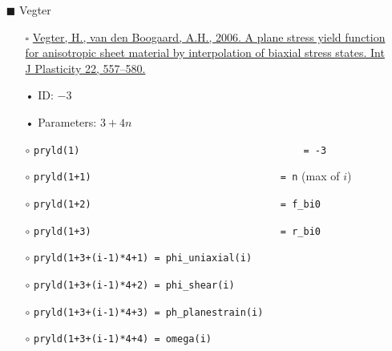 \documentclass[11pt,a4paper,twoside,final,onecolumn,titlepage]{article}
\begin{document}
\newpage
\begin{itemize}
	\item[\tiny$\blacksquare$] Vegter
	\begin{itemize}
		\item[\tiny$\square$] {\small \href{https://doi.org/10.1016/j.ijplas.2005.04.009}{Vegter, H., van den Boogaard, A.H., 2006. A plane stress yield function for anisotropic sheet material by interpolation of biaxial stress states. Int J Plasticity 22, 557–580.}}\\
		\item[•] ID: $-3$
		\item[•] Parameters: $3+4n$\\
		\item[$\circ$] \texttt{pryld(1)\,\,\,\,\,\,\,\,\,\,\,\,\,\,\,\,\,\,\,\,\,\,\,\,\,\,\,\,\,\,\,\,\,\,\,\,\,\,\,= -3}
		\item[$\circ$] \texttt{pryld(1+1)\,\,\,\,\,\,\,\,\,\,\,\,\,\,\,\,\,\,\,\,\,\,\,\,\,\,\,\,\,\,\,\,\,= n} (max of $i$)
		\item[$\circ$] \texttt{pryld(1+2)\,\,\,\,\,\,\,\,\,\,\,\,\,\,\,\,\,\,\,\,\,\,\,\,\,\,\,\,\,\,\,\,\,= f\_bi0}
		\item[$\circ$] \texttt{pryld(1+3)\,\,\,\,\,\,\,\,\,\,\,\,\,\,\,\,\,\,\,\,\,\,\,\,\,\,\,\,\,\,\,\,\,= r\_bi0}
		\item[$\circ$] \texttt{pryld(1+3+(i-1)*4+1) = phi\_uniaxial(i)}
		\item[$\circ$] \texttt{pryld(1+3+(i-1)*4+2) = phi\_shear(i)}
		\item[$\circ$] \texttt{pryld(1+3+(i-1)*4+3) = ph\_planestrain(i)}
		\item[$\circ$] \texttt{pryld(1+3+(i-1)*4+4) = omega(i)}\\
	\end{itemize}
\end{itemize}
\end{document}
